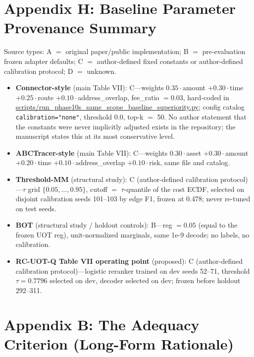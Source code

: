 \documentclass[journal]{IEEEtran}
\begin{document}
\section*{Appendix H: Baseline Parameter Provenance Summary}

Source types: A $=$ original paper/public implementation; B $=$ pre-evaluation frozen adapter defaults; C $=$ author-defined fixed constants or author-defined calibration protocol; D $=$ unknown.

\begin{itemize}
\item \textbf{Connector-style} (main Table VII): C---weights $0.35\cdot$amount $+ 0.30\cdot$time $+ 0.25\cdot$route $+ 0.10\cdot$address\_overlap, fee\_ratio $= 0.03$, hard-coded in \url{scripts/run_phase10s_same_scope_baseline_superiority.py}; config catalog \texttt{calibration="none"}, threshold 0.0, top-k $=$ 50. No author statement that the constants were never implicitly adjusted exists in the repository; the manuscript states this at its most conservative level.
\item \textbf{ABCTracer-style} (main Table VII): C---weights $0.30\cdot$asset $+ 0.30\cdot$amount $+ 0.20\cdot$time $+ 0.10\cdot$address\_overlap $+ 0.10\cdot$risk, same file and catalog.
\item \textbf{Threshold-MM} (structural study): C (author-defined calibration protocol)---$\tau$ grid $\{0.05,\dots,0.95\}$, cutoff $=$ $\tau$-quantile of the cost ECDF, selected on disjoint calibration seeds 101--103 by edge F1, frozen at 0.478; never re-tuned on test seeds.
\item \textbf{BOT} (structural study / holdout controls): B---reg $= 0.05$ (equal to the frozen UOT reg), unit-normalized marginals, same 1e-9 decode; no labels, no calibration.
\item \textbf{RC-UOT-Q Table VII operating point} (proposed): C (author-defined calibration protocol)---logistic reranker trained on dev seeds 52--71, threshold $\tau = 0.7796$ selected on dev, decoder selected on dev; frozen before holdout 292--311.
\end{itemize}

\section*{Appendix B: The Adequacy Criterion (Long-Form Rationale)}
\end{document}
